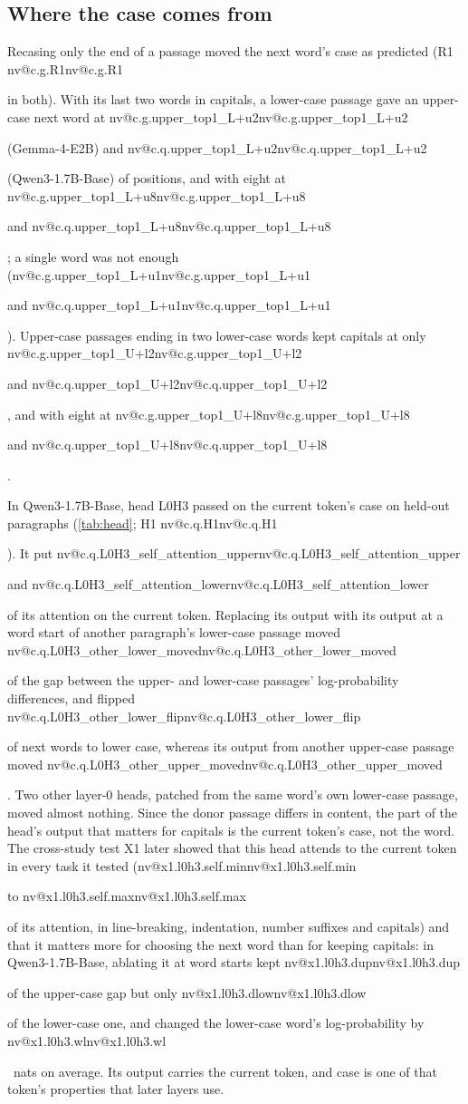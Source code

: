 \documentclass[11pt]{article}
\makeatletter
\newcommand{\nv}[1]{\ifcsname nv@#1\endcsname\csname nv@#1\endcsname\else\PackageError{numbers}{Unknown number key #1}{}\fi}
\newcommand{\G}[1]{\nv{c.g.#1}}
\newcommand{\Q}[1]{\nv{c.q.#1}}
\newcommand{\gm}{Gemma-4-E2B}
\newcommand{\qw}{Qwen3-1.7B-Base}
\newcommand{\hd}[2]{L#1H#2}
\makeatother
\begin{document}
\subsection{Where the case comes from}

Recasing only the end of a passage moved the next word's case as predicted (R1 \G{R1} in both). With its last two words in capitals, a lower-case passage gave an upper-case next word at \G{upper_top1_L+u2} (\gm{}) and \Q{upper_top1_L+u2} (\qw{}) of positions, and with eight at \G{upper_top1_L+u8} and \Q{upper_top1_L+u8}; a single word was not enough (\G{upper_top1_L+u1} and \Q{upper_top1_L+u1}). Upper-case passages ending in two lower-case words kept capitals at only \G{upper_top1_U+l2} and \Q{upper_top1_U+l2}, and with eight at \G{upper_top1_U+l8} and \Q{upper_top1_U+l8}.

In \qw{}, head \hd{0}{3} passed on the current token's case on held-out paragraphs (\cref{tab:head}; H1 \Q{H1}). It put \Q{L0H3_self_attention_upper} and \Q{L0H3_self_attention_lower} of its attention on the current token. Replacing its output with its output at a word start of another paragraph's lower-case passage moved \Q{L0H3_other_lower_moved} of the gap between the upper- and lower-case passages' log-probability differences, and flipped \Q{L0H3_other_lower_flip} of next words to lower case, whereas its output from another upper-case passage moved \Q{L0H3_other_upper_moved}. Two other layer-0 heads, patched from the same word's own lower-case passage, moved almost nothing. Since the donor passage differs in content, the part of the head's output that matters for capitals is the current token's case, not the word. The cross-study test X1 later showed that this head attends to the current token in every task it tested (\nv{x1.l0h3.self.min} to \nv{x1.l0h3.self.max} of its attention, in line-breaking, indentation, number suffixes and capitals) and that it matters more for choosing the next word than for keeping capitals: in \qw{}, ablating it at word starts kept \nv{x1.l0h3.dup} of the upper-case gap but only \nv{x1.l0h3.dlow} of the lower-case one, and changed the lower-case word's log-probability by \nv{x1.l0h3.wl}~nats on average. Its output carries the current token, and case is one of that token's properties that later layers use.
\end{document}
